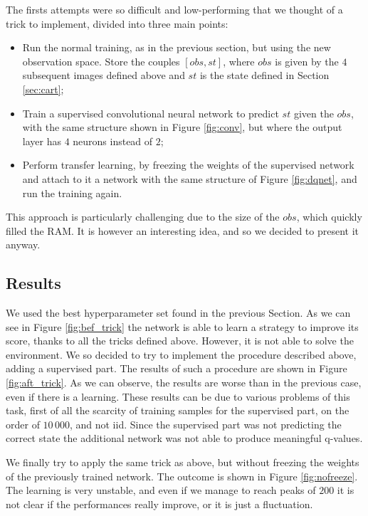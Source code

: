 The firsts attempts were so difficult and low-performing that we thought of a trick to implement, divided into three main points:
\begin{itemize}
    \item Run the normal training, as in the previous section, but using the new observation space. Store the couples $[obs, st]$, where 
        $obs$ is given by the $4$ subsequent images defined above and $st$ is the state defined in Section \ref{sec:cart};
    \item Train a supervised convolutional neural network to predict $st$ given the $obs$, with the same structure shown in Figure \ref{fig:conv}, but where 
        the output layer has $4$ neurons instead of $2$;
    \item Perform transfer learning, by freezing the weights of the supervised network and attach to it a network with the same structure of Figure \ref{fig:dqnet}, and run
        the training again.
\end{itemize} 
This approach is particularly challenging due to the size of the $obs$, which quickly filled the RAM. It is however an interesting idea, and so we decided to present it 
anyway. 


\subsection{Results}
We used the best hyperparameter set found in the previous Section. As we can see in Figure \ref{fig:bef_trick} the network is able to learn a strategy to improve 
its score, thanks to all the tricks defined above. However, it is not able to solve the environment. We so decided to try to implement the procedure described 
above, adding a supervised part. The results of such a procedure are shown in Figure \ref{fig:aft_trick}. As we can observe, the results are worse than in the previous 
case, even if there is a learning. These results can be due to various problems of this task, first of all the scarcity of training samples for the supervised part,
on the order of $10\,000$, and not iid. Since the supervised part was not predicting the correct state the additional network was not able to produce meaningful
q-values.

We finally try to apply the same trick as above, but without freezing the weights of the previously trained network. The outcome is shown in Figure \ref{fig:nofreeze}. 
The learning is very unstable, and even if we manage to reach peaks of $200$ it is not clear if the performances really improve, or it is just a fluctuation.